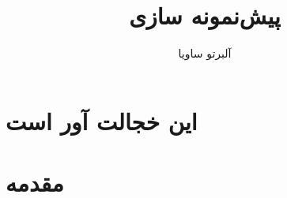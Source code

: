 \documentclass[a5paper,14pt]{book}
\author{آلبرتو ساویا}
\title{پیش‌نمونه سازی}
\begin{document}
\frontmatter
\maketitle
\tableofcontents

\chapter{این خجالت آور است}

\chapter{مقدمه}

\mainmatter
\end{document}
